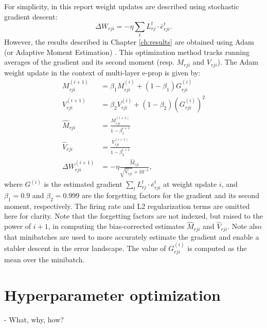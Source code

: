 	For simplicity, in this report weight updates are described using stochastic gradient descent:
	\begin{equation}
		\Delta W_{rji} = -\eta \sum_t L^t_{rj}\cdot\bar{e}^t_{rji}.
	\end{equation}
	However, the results described in Chapter \ref{ch:results} are obtained using Adam (or Adaptive Moment Estimation) \citep{kingma2014adam}.
	This optimization method tracks running averages of the gradient and its second moment (resp. $M_{rji}$ and $V_{rji}$).
	The Adam weight update in the context of multi-layer e-prop is given by:
	\begin{align}
	M_{rji}^{(i+1)} &= \beta_1 M_{rji}^{(i)} + \left(1 - \beta_1\right)G^{(i)}_{rji} \\
	V_{rji}^{(i+1)} &= \beta_2 V_{rji}^{(i)} + \left(1 - \beta_2\right)\left(G^{(i)}_{rji}\right)^2 \\
	\widehat{M}_{rji} &= \frac{M_{rji}^{(i+1)}}{1 - \beta_1^{i+1}} \\
	\widehat{V}_{rji} &= \frac{V_{rji}^{(i+1)}}{1 - \beta_2^{i+1}} \\
	\Delta W_{rji}^{(i+1)} &= -\eta \frac{\widehat{M}_{rji}}{\sqrt{\widehat{V}_{rji}} + 10^{-5}},
	\end{align}
	where $G^{(i)}$ is the estimated gradient $\sum_t L^t_{rj}\cdot\bar{e}^t_{rji}$ at weight update $i$, and $\beta_1=0.9$ and $\beta_2=0.999$ are the forgetting factors for the gradient and its second moment, respectively.
	The firing rate and L2 regularization terms are omitted here for clarity.
	Note that the forgetting factors are not indexed, but raised to the power of $i+1$, in computing the bias-corrected estimates $\widehat{M}_{rji}$ and $\widehat{V}_{rji}$.
	Note also that minibatches are used to more accurately estimate the gradient and enable a stabler descent in the error landscape.
	The value of $G^{(i)}_{rji}$ is computed as the mean over the minibatch.


\section{Hyperparameter optimization}
	\begin{tcolorbox}[colback=orange]
	- What, why, how?

	\end{tcolorbox}

